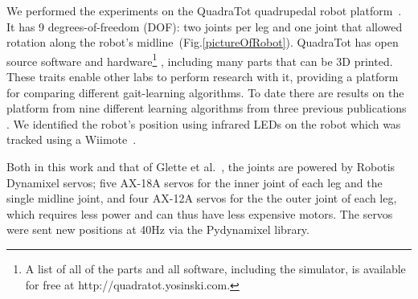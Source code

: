 We performed the experiments on the QuadraTot quadrupedal robot platform~\cite{yos:clune}.
It has 9 degrees-of-freedom (DOF): two joints per leg and one joint that allowed rotation along the robot's midline~(Fig.\ref{pictureOfRobot}). %
QuadraTot has open source software and hardware\footnote{A list of all of the parts and all software, including the simulator, is available for free at http://quadratot.yosinski.com.} %
, including many parts that can be 3D printed. These traits enable other labs to perform research with it, providing a platform for comparing different gait-learning algorithms. 
To date there are results on the platform from nine different learning algorithms from three previous publications \cite{yos:clune,glette,haocheng}. We identified the robot's position using infrared LEDs on the robot which was tracked using a Wiimote~\cite{yos:clune}.

Both in this work and that of Glette et al.~\cite{glette}, the joints are powered by Robotis Dynamixel servos; five AX-18A servos for the inner joint of each leg and the single midline joint, and four AX-12A servos for the the outer joint of each leg, which requires less power and can thus have less expensive motors. The servos were sent new positions at 40Hz via the Pydynamixel library. 

